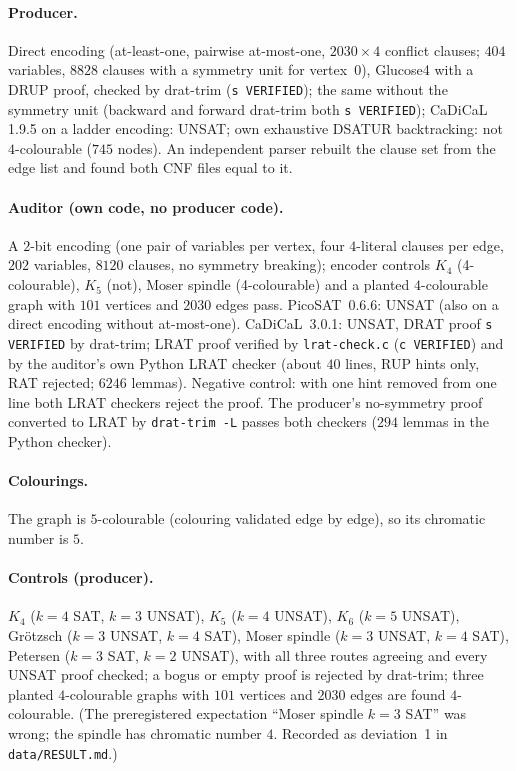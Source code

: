 \documentclass[10pt]{article}
\begin{document}
\paragraph{Producer.} Direct encoding (at-least-one, pairwise at-most-one, $2030\times4$ conflict clauses; $404$ variables, $8828$ clauses with a symmetry unit for vertex~$0$), Glucose4 with a DRUP proof, checked by drat-trim (\texttt{s VERIFIED}); the same without the symmetry unit (backward and forward drat-trim both \texttt{s VERIFIED}); CaDiCaL 1.9.5 on a ladder encoding: UNSAT; own exhaustive DSATUR backtracking: not $4$-colourable ($745$ nodes). An independent parser rebuilt the clause set from the edge list and found both CNF files equal to it.
\paragraph{Auditor (own code, no producer code).} A $2$-bit encoding (one pair of variables per vertex, four $4$-literal clauses per edge, $202$ variables, $8120$ clauses, no symmetry breaking); encoder controls $K_4$ (4-colourable), $K_5$ (not), Moser spindle (4-colourable) and a planted $4$-colourable graph with $101$ vertices and $2030$ edges pass. PicoSAT~0.6.6: UNSAT (also on a direct encoding without at-most-one). CaDiCaL~3.0.1: UNSAT, DRAT proof \texttt{s VERIFIED} by drat-trim; LRAT proof verified by \texttt{lrat-check.c} (\texttt{c VERIFIED}) and by the auditor's own Python LRAT checker (about $40$ lines, RUP hints only, RAT rejected; $6246$ lemmas). Negative control: with one hint removed from one line both LRAT checkers reject the proof. The producer's no-symmetry proof converted to LRAT by \texttt{drat-trim -L} passes both checkers ($294$ lemmas in the Python checker).
\paragraph{Colourings.} The graph is $5$-colourable (colouring validated edge by edge), so its chromatic number is $5$.
\paragraph{Controls (producer).} $K_4$ ($k=4$ SAT, $k=3$ UNSAT), $K_5$ ($k=4$ UNSAT), $K_6$ ($k=5$ UNSAT), Gr\"otzsch ($k=3$ UNSAT, $k=4$ SAT), Moser spindle ($k=3$ UNSAT, $k=4$ SAT), Petersen ($k=3$ SAT, $k=2$ UNSAT), with all three routes agreeing and every UNSAT proof checked; a bogus or empty proof is rejected by drat-trim; three planted $4$-colourable graphs with $101$ vertices and $2030$ edges are found $4$-colourable. (The preregistered expectation ``Moser spindle $k=3$ SAT'' was wrong; the spindle has chromatic number $4$. Recorded as deviation~1 in \texttt{data/RESULT.md}.)
\end{document}
